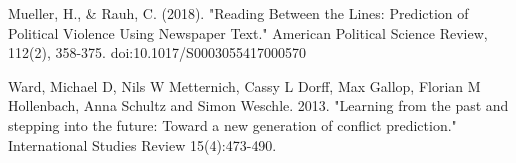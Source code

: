 \noindent Mueller, H., \& Rauh, C. (2018). "Reading Between the Lines: Prediction of Political \newline \indent Violence Using Newspaper Text." American Political Science Review, 112(2), 358-375. \newline \indent doi:10.1017/S0003055417000570\vspace{0.25cm}

\noindent Ward, Michael D, Nils W Metternich, Cassy L Dorff, Max Gallop, Florian M Hollenbach, \newline \indent Anna Schultz and Simon Weschle. 2013. "Learning from the past and stepping into \newline \indent the future: Toward a new generation of conflict prediction." International Studies \newline \indent Review 15(4):473-490.

\clearpage

